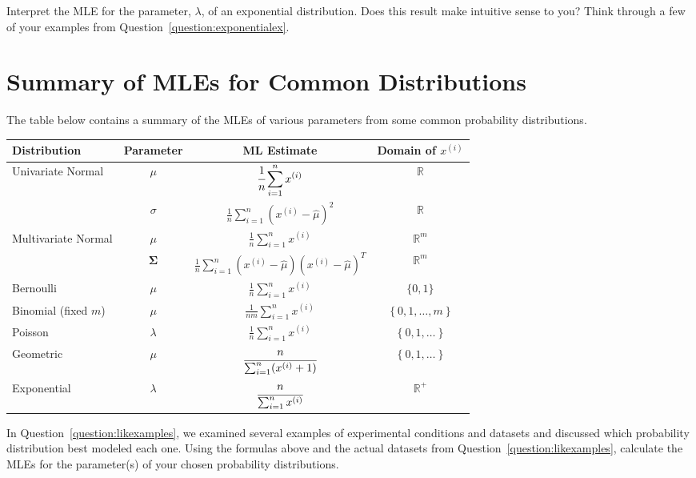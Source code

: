 \begin{question}{}
Interpret the MLE for the parameter, $\lambda$, of an exponential distribution. Does this result make intuitive sense to you? Think through a few of your examples from Question~\ref{question:exponentialex}. 
\end{question}

\section{Summary of MLEs for Common Distributions}

The table below contains a summary of the MLEs of various parameters from some common probability distributions.

\begin{center} {\small
\begin{tabular}{lccc}
\toprule
Distribution & Parameter & ML Estimate & Domain of $x^{(i)}$ \\
\midrule
Univariate Normal & $\mu$ & $\displaystyle \cfrac{1}{n} \sum_{i=1}^n x^{(i)}$  & $\mathbb{R}$ \\
& $\sigma$ & $\displaystyle \frac{1}{n} \sum_{i=1}^n \left(x^{(i)} - \hat{\mu}\right)^2 $ & $\mathbb{R}$ \\
Multivariate Normal & $\mu$ & $\displaystyle \frac{1}{n} \sum_{i=1}^n x^{(i)}$ & $\mathbb{R}^m$ \\
& $\boldsymbol\Sigma$ & $\displaystyle \frac{1}{n} \sum_{i=1}^n (x^{(i)}-\hat{\mu})(x^{(i)}-\hat{\mu})^T$ & $\mathbb{R}^m$ \\
Bernoulli & $\mu$ & $\displaystyle \frac{1}{n} \sum_{i=1}^n x^{(i)}$ & $\{0, 1\}$ \\
Binomial (fixed $m$) & $\mu$ & $\displaystyle \frac{1}{nm} \sum_{i=1}^n x^{(i)}$ & $\left\{ 0, 1, \dots, m \right\}$ \\
Poisson & $\lambda$ & $\displaystyle \frac{1}{n} \sum_{i=1}^n x^{(i)}$ & $\left\{ 0, 1, \dots \right\}$\\
Geometric & $\mu$ & $\displaystyle \cfrac{n}{\sum_{i=1}^n (x^{(i)} + 1)} $ & $\left\{ 0, 1, \dots \right\}$ \\
Exponential & $\lambda$ & $\displaystyle \cfrac{n}{\sum_{i=1}^n x^{(i)}} $ & $\mathbb{R}^+$ \\
\bottomrule
\end{tabular}}
\end{center}

\begin{question}{}
In Question~\ref{question:likexamples}, we examined several examples of experimental conditions and datasets and discussed which probability distribution best modeled each one. Using the formulas above and the actual datasets from Question~\ref{question:likexamples}, calculate the MLEs for the parameter(s) of your chosen probability distributions. 
\end{question}
